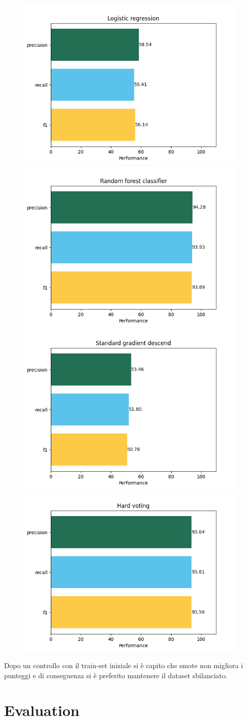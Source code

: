 \documentclass[a4paper]{article}
\begin{document}
    \begin{figure}[!h]
        \centering
        \includegraphics[width=0.4\linewidth]{scores/logistic regression.png}
        \includegraphics[width=0.4\linewidth]{scores/random forest classifier.png}
        \includegraphics[width=0.4\linewidth]{scores/standard gradient descend.png}
        \includegraphics[width=0.4\linewidth]{scores/hard voting.png}

    \end{figure}

    Dopo un controllo con il train-set iniziale si è capito che smote non migliora i punteggi e di conseguenza
     si è preferito mantenere il dataset sbilanciato.

    \section{Evaluation}
\end{document}
